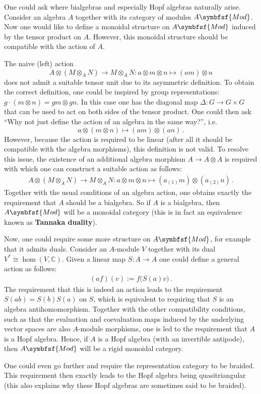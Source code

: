     \begin{remark}
        One could ask where bialgebras and especially Hopf algebras naturally arise. Consider an algebra $A$ together with its category of modules $A\symbfsf{Mod}$. Now one would like to define a monoidal structure on $A\symbfsf{Mod}$ induced by the tensor product on $A$. However, this monoidal structure should be compatible with the action of $A$.

        The naive (left) action \[A\otimes(M\otimes_A N)\rightarrow M\otimes_AN: a\otimes m\otimes n\mapsto (am)\otimes n\] does not admit a suitable tensor unit due to its asymmetric definition. To obtain the correct definition, one could be inspired by group representations: $g\cdot(m\otimes n) = gm\otimes gn$. In this case one has the diagonal map $\Delta:G\rightarrow G\times G$ that can be used to act on both sides of the tensor product. One could then ask ``Why not just define the action of an algebra in the same way?'', i.e.~\[a\otimes (m\otimes n)\mapsto (am)\otimes(an)\,.\] However, because the action is required to be linear (after all it should be compatible with the algebra morphisms), this definition is not valid. To resolve this issue, the existence of an additional algebra morphism $A\rightarrow A\otimes A$ is required with which one can construct a suitable action as follows:
        \begin{gather}
            A\otimes(M\otimes_AN)\rightarrow M\otimes_AN:a\otimes m\otimes n\mapsto (a_{(1)}m)\otimes(a_{(2)}n)\,.
        \end{gather}
        Together with the usual conditions of an algebra action, one obtains exactly the requirement that $A$ should be a bialgebra. So if $A$ is a bialgebra, then $A\symbfsf{Mod}$ will be a monoidal category (this is in fact an equivalence known as \textbf{Tannaka duality}).

        Now, one could require some more structure on $A\symbfsf{Mod}$, for example that it admits duals. Consider an $A$-module $V$ together with its dual $V^*\cong\hom(V,\mathbb{C})$. Given a linear map $S:A\rightarrow A$ one could define a general action as follows:
        \begin{gather}
            (af)(v) := f\bigl(S(a)v\bigr)\,.
        \end{gather}
        The requirement that this is indeed an action leads to the requirement $S(ab)=S(b)S(a)$ on $S$, which is equivalent to requiring that $S$ is an algebra antihomomorphism. Together with the other compatibility conditions, such as that the evaluation and coevaluation maps induced by the underlying vector spaces are also $A$-module morphisms, one is led to the requirement that $A$ is a Hopf algebra. Hence, if $A$ is a Hopf algebra (with an invertible antipode), then $A\symbfsf{Mod}$ will be a rigid monoidal category.

        One could even go further and require the representation category to be braided. This requirement then exactly leads to the Hopf algebra being quasitriangular (this also explains why these Hopf algebras are sometimes said to be braided).
    \end{remark}

